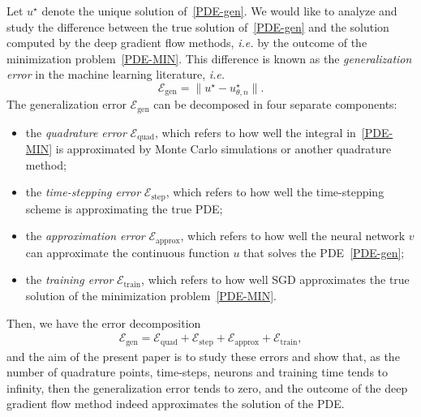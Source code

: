 \documentclass[11pt,a4paper,reqno]{amsart}
\numberwithin{equation}{section}
\theoremstyle{plain}
\theoremstyle{definition}
\begin{document}
Let $u^\star$ denote the unique solution of~\eqref{PDE-gen}.
We would like to analyze and study the difference between the true solution of~\eqref{PDE-gen} and the solution computed by the deep gradient flow methods, \emph{i.e.} by the outcome of the minimization problem~\eqref{PDE-MIN}.
This difference is known as the \textit{generalization error} in the machine learning literature, \emph{i.e.} 
\[
    \mathcal E_\text{gen} = \| u^\star - u^\star_{\theta, n}\|.
\]
The generalization error $\mathcal E_\text{gen}$ can be decomposed in four separate components:
\begin{itemize}
    \item the \textit{quadrature error} $\mathcal E_\text{quad}$, which refers to how well the integral in~\eqref{PDE-MIN} is approximated by Monte Carlo simulations or another quadrature method;
    \item the \textit{time-stepping error} $\mathcal E_\text{step}$, which refers to how well the time-stepping scheme is approximating the true PDE;
    \item the \textit{approximation error} $\mathcal E_\text{approx}$, which refers to how well the neural network $v$ can approximate the continuous function $u$ that solves the PDE~\eqref{PDE-gen};
    \item the \textit{training error} $\mathcal E_\text{train}$, which refers to how well SGD approximates the true solution of the minimization problem~\eqref{PDE-MIN}.
\end{itemize}
Then, we have the error decomposition 
\begin{align}
    \label{eq:error-decomposition}
    \mathcal E_\text{gen} = \mathcal E_\text{quad} + \mathcal E_\text{step} + \mathcal E_\text{approx} + \mathcal E_\text{train} ,
\end{align}
and the aim of the present paper is to study these errors and show that, as the number of quadrature points, time-steps, neurons and training time tends to infinity, then the generalization error tends to zero, and the outcome of the deep gradient flow method indeed approximates the solution of the PDE.
\end{document}
